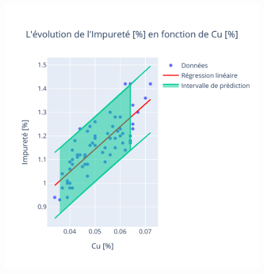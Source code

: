\documentclass[12pt]{article}
\begin{document}
\begin{figure}[H]
{\begin{minipage}{0.8\textwidth}
            \includegraphics[width=\textwidth]{Images/Statistique/Regression_Impurete_Cu.pdf}
        \end{minipage}
    }\\[0.5cm]  %
\end{figure}
\end{document}
